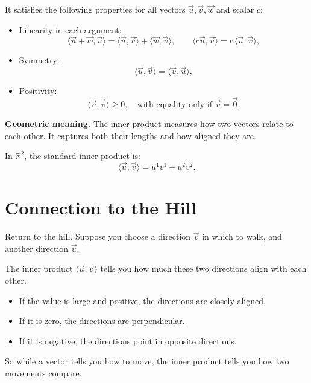 \documentclass[11pt,openany]{book}
\theoremstyle{definition}
\begin{document}
\medskip

It satisfies the following properties for all vectors $\vec{u}, \vec{v}, \vec{w}$ 
and scalar $c$:
\begin{itemize}
  \item Linearity in each argument:
  \[
  \langle \vec{u} + \vec{w}, \vec{v} \rangle = \langle \vec{u}, \vec{v} \rangle + \langle \vec{w}, \vec{v} \rangle,
  \qquad
  \langle c\vec{u}, \vec{v} \rangle = c\,\langle \vec{u}, \vec{v} \rangle,
  \]
  \item Symmetry:
  \[
  \langle \vec{u}, \vec{v} \rangle = \langle \vec{v}, \vec{u} \rangle,
  \]
  \item Positivity:
  \[
  \langle \vec{v}, \vec{v} \rangle \geq 0,
  \quad \text{with equality only if } \vec{v} = \vec{0}.
  \]
\end{itemize}

\medskip

\textbf{Geometric meaning.} The inner product measures how two vectors relate to 
each other. It captures both their lengths and how aligned they are.

\medskip

In $\mathbb{R}^2$, the standard inner product is:
\[
\langle \vec{u}, \vec{v} \rangle = u^1 v^1 + u^2 v^2.
\]

\medskip

\section{Connection to the Hill}

Return to the hill. Suppose you choose a direction $\vec{v}$ in which to walk, and 
another direction $\vec{u}$.

\medskip

The inner product $\langle \vec{u}, \vec{v} \rangle$ tells you how much these two 
directions align with each other.

\begin{itemize}
  \item If the value is large and positive, the directions are closely aligned.
  \item If it is zero, the directions are perpendicular.
  \item If it is negative, the directions point in opposite directions.
\end{itemize}

\medskip

So while a vector tells you how to move, the inner product tells you how two 
movements compare.
\end{document}
